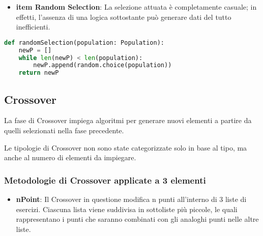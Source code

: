 \documentclass{article}
\begin{document}
\pagebreak

\begin{itemize}

\item\textbf{item Random Selection}: La selezione attuata è completamente casuale; in effetti, l'assenza di una logica sottostante può generare dati del tutto inefficienti.

\end{itemize}

\begin{lstlisting}[language=Python, breaklines, no caption]
def randomSelection(population: Population):
    newP = []
    while len(newP) < len(population):
        newP.append(random.choice(population))
    return newP
        \end{lstlisting}

\subsection{Crossover}

La fase di Crossover impiega algoritmi per generare nuovi elementi a partire da quelli selezionati nella fase precedente.

Le tipologie di Crossover non sono state categorizzate solo in base al tipo, ma anche al numero di elementi da impiegare.

\subsubsection {Metodologie di Crossover applicate a 3 elementi}

\begin{itemize}
\item\textbf{nPoint}: Il Crossover in questione modifica n punti all'interno di 3 liste di esercizi. Ciascuna lista viene suddivisa in sottoliste più piccole, le quali rappresentano i punti che saranno combinati con gli analoghi punti nelle altre liste.
\end{itemize}
\end{document}

